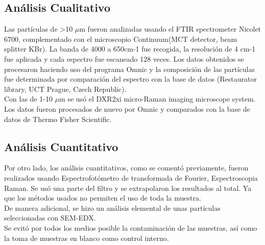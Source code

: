 \documentclass[a4paper,11pt]{article}
\begin{document}
	\subsection{Análisis Cualitativo}
	Las partículas de >10 $\mu$m fueron analizadas usando el FTIR spectrometer Nicolet 6700, complementado con el microscopio Continuum(MCT detector, beam splitter KBr). La banda de 4000 a 650cm-1 fue recogida, la resolución de 4 cm-1 fue aplicada y cada espectro fue escaneado 128 veces. Los datos obtenidos se procesaron haciendo uso del programa Omnic y la composición de las partículas fue determinada por comparación del espectro con la base de datos (Restaurator library, UCT Prague, Czech Republic).\\
	Con las de 1-10 $\mu$m se usó el DXR2xi micro-Raman imaging microscope system. Los datos fueron procesados de nuevo por Omnic y comparados con la base de datos de Thermo Fisher Scientific.
	
	\subsection{Análisis Cuantitativo}
	Por otro lado, los análisis cuantitativos, como se comentó previamente, fueron realizados usando Espectrofotómetro de transformada de Fourier, Espectroscopia Raman. Se usó una parte del filtro y se extrapolaron los resultados al total. Ya que los métodos usados no permiten el uso de toda la muestra.\\
	De manera adicional, se hizo un análisis elemental de unas partículas seleccionadas con SEM-EDX.\\
	Se evitó por todos los medios posible la contaminación de las muestras, así como la toma de muestras en blanco como control interno.
\end{document}
